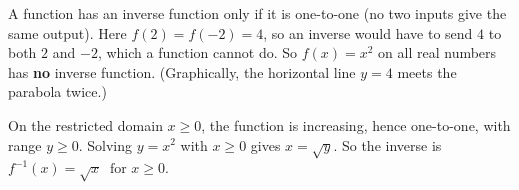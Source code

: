 A function has an inverse function only if it is one-to-one (no two inputs give the same output). Here $f(2)=f(-2)=4$, so an inverse would have to send $4$ to both $2$ and $-2$, which a function cannot do. So $f(x)=x^2$ on all real numbers has \textbf{no} inverse function. (Graphically, the horizontal line $y=4$ meets the parabola twice.)

On the restricted domain $x\ge0$, the function is increasing, hence one-to-one, with range $y\ge0$. Solving $y=x^2$ with $x\ge0$ gives $x=\sqrt y$. So the inverse is $\boxed{f^{-1}(x)=\sqrt{x}\ \text{ for } x\ge0}$.
